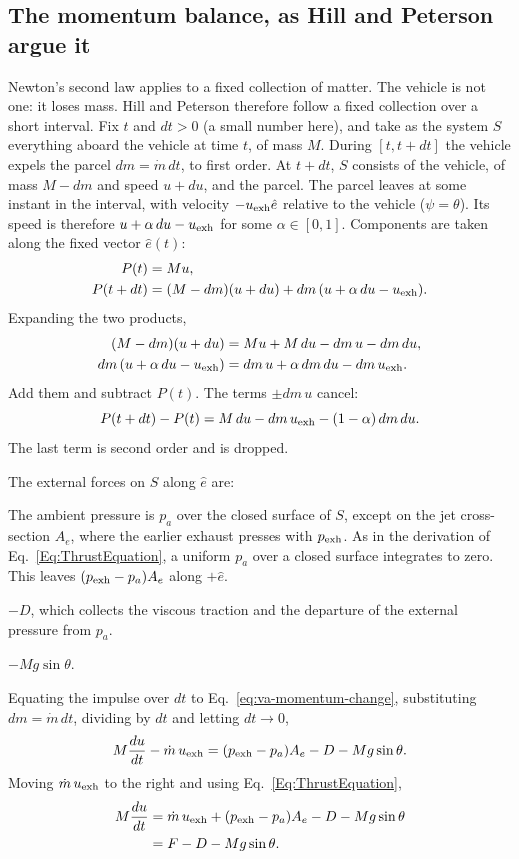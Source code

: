 \subsection{The momentum balance, as Hill and Peterson argue it}
\label{sec:va-momentum}
Newton's second law applies to a fixed collection of matter. The vehicle
is not one: it loses mass. Hill and Peterson therefore follow a fixed
collection over a short interval. Fix $t$ and $dt>0$ (a small number here),
and take as the system $S$ everything aboard the vehicle at time $t$, of mass
$M$. During $[t,t+dt]$ the vehicle expels the parcel $dm=\dot m\,dt$, to
first order. At $t+dt$, $S$ consists of the vehicle, of mass $M-dm$ and speed
$u+du$, and the parcel. The parcel leaves at some instant in the interval,
with velocity $-u_{\rm exh}\hat e$ relative to the vehicle ($\psi=\theta$).
Its speed is therefore $u+\alpha\,du-u_{\rm exh}$ for some
$\alpha\in[0,1]$. Components are taken along the fixed vector $\hat e(t)$:
\[
\begin{aligned}
 P(t)&=Mu,\\
 P(t+dt)&=(M-dm)(u+du)+dm\,(u+\alpha\,du-u_{\rm exh}).
\end{aligned}
\]
Expanding the two products,
\[
\begin{aligned}
 (M-dm)(u+du)&=Mu+M\,du-dm\,u-dm\,du,\\
 dm\,(u+\alpha\,du-u_{\rm exh})&=dm\,u+\alpha\,dm\,du-dm\,u_{\rm exh} .
\end{aligned}
\]
Add them and subtract $P(t)$. The terms $\pm dm\,u$ cancel:
\begin{equation}\label{eq:va-momentum-change}
 P(t+dt)-P(t)=M\,du-dm\,u_{\rm exh}-(1-\alpha)\,dm\,du .
\end{equation}
The last term is second order and is dropped.

The external forces on $S$ along $\hat e$ are:
\begin{description}\itemsep1pt
\item[Pressure.] The ambient pressure is $p_a$ over the closed surface of
  $S$, except on the jet cross-section $A_e$, where the earlier exhaust
  presses with $p_{\rm exh}$. As in the derivation of
  Eq.~\ref{Eq:ThrustEquation}, a uniform $p_a$ over a closed surface
  integrates to zero. This leaves $(p_{\rm exh}-p_a)A_e$ along $+\hat e$.
\item[Drag.] $-D$, which collects the viscous traction and the departure of
  the external pressure from $p_a$.
\item[Gravity.] $-Mg\sin\theta$.
\end{description}
Equating the impulse over $dt$ to Eq.~\ref{eq:va-momentum-change},
substituting $dm=\dot m\,dt$, dividing by $dt$ and letting $dt\to0$,
\[
 M\frac{du}{dt}-\dot m\,u_{\rm exh}=(p_{\rm exh}-p_a)A_e-D-Mg\sin\theta .
\]
Moving $\dot m\,u_{\rm exh}$ to the right and using
Eq.~\ref{Eq:ThrustEquation},
\begin{equation}\label{eq:va-tangential}
\begin{aligned}
 M\frac{du}{dt}
 &=\dot m\,u_{\rm exh}+(p_{\rm exh}-p_a)A_e-D-Mg\sin\theta\\
 &=F-D-Mg\sin\theta .
\end{aligned}
\end{equation}

